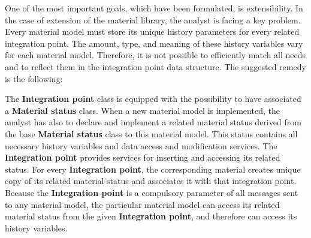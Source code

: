 \documentclass[12pt,draft]{article}
\newcommand{\class}[1]{{\bf #1}}
\begin{document}
One of the most important goals, which have been formulated, is
extensibility. In the case of extension of the material library, the
analyst is facing  a key problem. Every material model must store
its unique history parameters for every related integration point. The
amount, type, and meaning of these history variables vary for each
material model. Therefore, it is not possible to efficiently
match all needs and to reflect them in the integration point data
structure. The suggested remedy is the following:

The \class{Integration point}  class is equipped with the possibility to have
associated a \class{Material status} class. When a new material model is
implemented, the analyst has also to declare and implement a related
material status derived from the base
\class{Material status} class to this material model. This status contains all necessary
history variables and data access and modification
services. The \class{Integration point} provides services for inserting and
accessing its related status. For every  \class{Integration point},
the corresponding material creates unique copy of its related material
status and associates it with that integration point. Because
the \class{Integration point} is a compulsory parameter of all messages sent to
any material model, the particular material model can access its
related material status from the given \class{Integration point}, and therefore can access its
history variables. 



\end{document}

